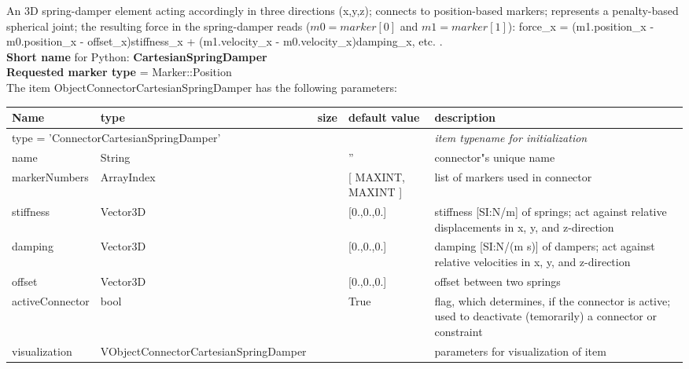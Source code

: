 An 3D spring-damper element acting accordingly in three directions (x,y,z); connects to position-based markers; represents a penalty-based spherical joint; the resulting force in the spring-damper reads ($m0 = marker[0]$ and $m1 = marker[1]$): \be force_x = (m1.position_x - m0.position_x - offset_x)\cdot stiffness_x + (m1.velocity_x - m0.velocity_x)\cdot damping_x, etc. \ee.
 \\
{\bf Short name} for Python: {\bf CartesianSpringDamper}
 \\  {\bf Requested marker type} = Marker::Position \\ 
The item ObjectConnectorCartesianSpringDamper has the following parameters:
\begin{center}
  \footnotesize
  \begin{longtable}{| p{4.5cm} | p{2.5cm} | p{0.5cm} | p{2.5cm} | p{6cm} |}
    \hline
    \bf Name & \bf type & \bf size & \bf default value & \bf description \\ \hline
    \multicolumn{4}{l}{\parbox{10cm}{type = 'ConnectorCartesianSpringDamper'}} & \multicolumn{1}{l}{\parbox{6cm}{\it item typename for initialization}}\\ \hline
    name &     String &      &     '' &     connector"s unique name\\ \hline
    markerNumbers &     ArrayIndex &      &     [ MAXINT, MAXINT ] &     list of markers used in connector\\ \hline
    stiffness &     Vector3D &      &     [0.,0.,0.] &     stiffness [SI:N/m] of springs; act against relative displacements in x, y, and z-direction\\ \hline
    damping &     Vector3D &      &     [0.,0.,0.] &     damping [SI:N/(m s)] of dampers; act against relative velocities in x, y, and z-direction\\ \hline
    offset &     Vector3D &      &     [0.,0.,0.] &     offset between two springs\\ \hline
    activeConnector &     bool &      &     True &     flag, which determines, if the connector is active; used to deactivate (temorarily) a connector or constraint\\ \hline
    visualization & VObjectConnectorCartesianSpringDamper & & & parameters for visualization of item \\ \hline
	  \end{longtable}
	\end{center}
